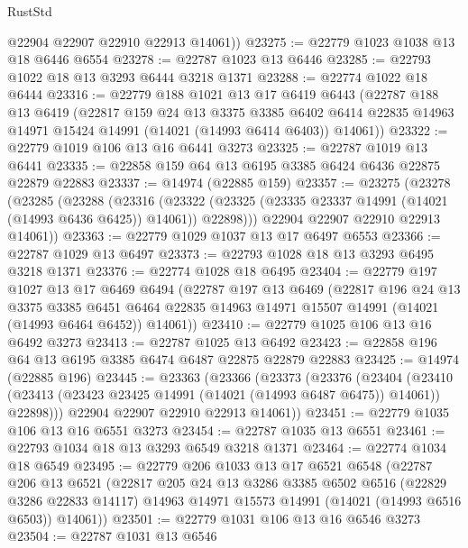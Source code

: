 \begin{lexlean}{RustStd}
\begin{coremodule}
        @22904
        @22907
        @22910
        @22913
        @14061))
@23275 := @22779 @1023 @1038 @13 @18 @6446 @6554
@23278 := @22787 @1023 @13 @6446
@23285 := @22793 @1022 @18 @13 @3293 @6444 @3218 @1371
@23288 := @22774 @1022 @18 @6444
@23316 := @22779
    @188
    @1021
    @13
    @17
    @6419
    @6443
    (@22787
      @188
      @13
      @6419
      (@22817
        @159
        @24
        @13
        @3375
        @3385
        @6402
        @6414
        @22835
        @14963
        @14971
        @15424
        @14991
        (@14021 (@14993 @6414 @6403))
        @14061))
@23322 := @22779 @1019 @106 @13 @16 @6441 @3273
@23325 := @22787 @1019 @13 @6441
@23335 := @22858 @159 @64 @13 @6195 @3385 @6424 @6436 @22875 @22879 @22883
@23337 := @14974 (@22885 @159)
@23357 := @23275
    (@23278
      (@23285
        (@23288
          (@23316
            (@23322 (@23325 (@23335 @23337 @14991 (@14021 (@14993 @6436 @6425)) @14061)) @22898)))
        @22904
        @22907
        @22910
        @22913
        @14061))
@23363 := @22779 @1029 @1037 @13 @17 @6497 @6553
@23366 := @22787 @1029 @13 @6497
@23373 := @22793 @1028 @18 @13 @3293 @6495 @3218 @1371
@23376 := @22774 @1028 @18 @6495
@23404 := @22779
    @197
    @1027
    @13
    @17
    @6469
    @6494
    (@22787
      @197
      @13
      @6469
      (@22817
        @196
        @24
        @13
        @3375
        @3385
        @6451
        @6464
        @22835
        @14963
        @14971
        @15507
        @14991
        (@14021 (@14993 @6464 @6452))
        @14061))
@23410 := @22779 @1025 @106 @13 @16 @6492 @3273
@23413 := @22787 @1025 @13 @6492
@23423 := @22858 @196 @64 @13 @6195 @3385 @6474 @6487 @22875 @22879 @22883
@23425 := @14974 (@22885 @196)
@23445 := @23363
    (@23366
      (@23373
        (@23376
          (@23404
            (@23410 (@23413 (@23423 @23425 @14991 (@14021 (@14993 @6487 @6475)) @14061)) @22898)))
        @22904
        @22907
        @22910
        @22913
        @14061))
@23451 := @22779 @1035 @106 @13 @16 @6551 @3273
@23454 := @22787 @1035 @13 @6551
@23461 := @22793 @1034 @18 @13 @3293 @6549 @3218 @1371
@23464 := @22774 @1034 @18 @6549
@23495 := @22779
    @206
    @1033
    @13
    @17
    @6521
    @6548
    (@22787
      @206
      @13
      @6521
      (@22817
        @205
        @24
        @13
        @3286
        @3385
        @6502
        @6516
        (@22829 @3286 @22833 @14117)
        @14963
        @14971
        @15573
        @14991
        (@14021 (@14993 @6516 @6503))
        @14061))
@23501 := @22779 @1031 @106 @13 @16 @6546 @3273
@23504 := @22787 @1031 @13 @6546

\end{coremodule}
\end{lexlean}
